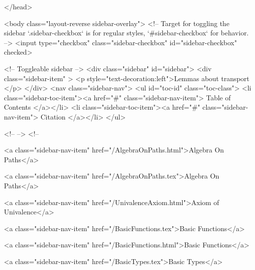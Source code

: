   
</head>




  <body class="layout-reverse sidebar-overlay">
    <!-- Target for toggling the sidebar `.sidebar-checkbox` is for regular
     styles, `#sidebar-checkbox` for behavior. -->
<input type="checkbox" class="sidebar-checkbox" id="sidebar-checkbox" checked>

<!-- Toggleable sidebar -->
<div class="sidebar" id="sidebar">
  <div class="sidebar-item" >
    <p style="text-decoration:left">Lemmas about transport </p>
  </div>
  <nav class="sidebar-nav">
    <ul id="toc-id" class="toc-class">
  <li class="sidebar-toc-item"><a href="#" class="sidebar-nav-item"> Table of Contents </a></li>
  <li class="sidebar-toc-item"><a href="#" class="sidebar-nav-item"> Citation </a></li>
</ul>


    <!--  -->
    <!-- 
      
    
      
    
      
    
      
        
      
    
      
        
          <a class="sidebar-nav-item" href="/AlgebraOnPaths.html">Algebra On Paths</a>
        
      
    
      
        
          <a class="sidebar-nav-item" href="/AlgebraOnPaths.tex">Algebra On Paths</a>
        
      
    
      
        
          <a class="sidebar-nav-item" href="/UnivalenceAxiom.html">Axiom of Univalence</a>
        
      
    
      
        
          <a class="sidebar-nav-item" href="/BasicFunctions.tex">Basic Functions</a>
        
      
    
      
        
          <a class="sidebar-nav-item" href="/BasicFunctions.html">Basic Functions</a>
        
      
    
      
        
          <a class="sidebar-nav-item" href="/BasicTypes.tex">Basic Types</a>
        
      
    
      
        
